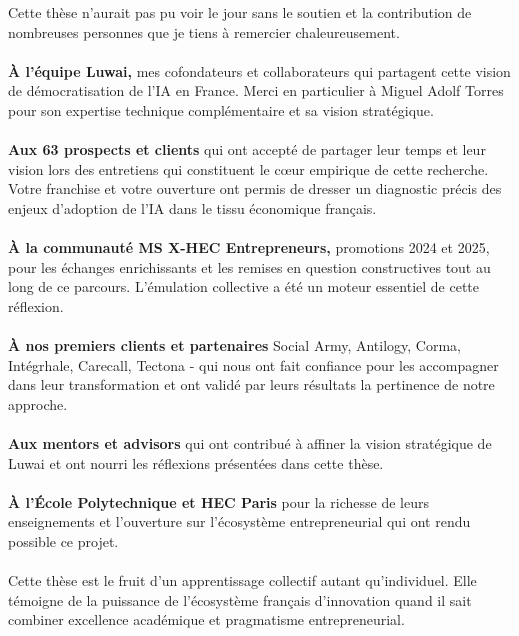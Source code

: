 Cette thèse n'aurait pas pu voir le jour sans le soutien et la contribution de nombreuses personnes que je tiens à remercier chaleureusement.
\\\\
\textbf{À l'équipe Luwai,} mes cofondateurs et collaborateurs qui partagent cette vision de démocratisation de l'IA en France. Merci en particulier à Miguel Adolf Torres pour son expertise technique complémentaire et sa vision stratégique.
\\\\
\textbf{Aux 63 prospects et clients} qui ont accepté de partager leur temps et leur vision lors des entretiens qui constituent le cœur empirique de cette recherche. Votre franchise et votre ouverture ont permis de dresser un diagnostic précis des enjeux d'adoption de l'IA dans le tissu économique français.
\\\\
\textbf{À la communauté MS X-HEC Entrepreneurs,} promotions 2024 et 2025, pour les échanges enrichissants et les remises en question constructives tout au long de ce parcours. L'émulation collective a été un moteur essentiel de cette réflexion.
\\\\
\textbf{À nos premiers clients et partenaires} Social Army, Antilogy, Corma, Intégrhale, Carecall, Tectona - qui nous ont fait confiance pour les accompagner dans leur transformation et ont validé par leurs résultats la pertinence de notre approche.
\\\\
\textbf{Aux mentors et advisors} qui ont contribué à affiner la vision stratégique de Luwai et ont nourri les réflexions présentées dans cette thèse.
\\\\
\textbf{À l'École Polytechnique et HEC Paris} pour la richesse de leurs enseignements et l'ouverture sur l'écosystème entrepreneurial qui ont rendu possible ce projet.
\\\\
Cette thèse est le fruit d'un apprentissage collectif autant qu'individuel. Elle témoigne de la puissance de l'écosystème français d'innovation quand il sait combiner excellence académique et pragmatisme entrepreneurial.

